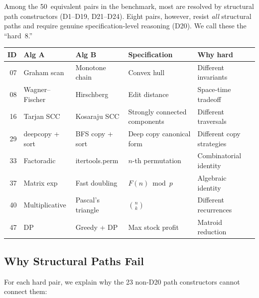 \documentclass[11pt,a4paper]{report}
\theoremstyle{definition}
\theoremstyle{plain}
\begin{document}
Among the 50~equivalent pairs in the benchmark, most are resolved
by structural path constructors (D1--D19, D21--D24).  Eight pairs,
however, resist \emph{all} structural paths and require genuine
specification-level reasoning (D20).  We call these the ``hard~8.''

\begin{center}
\small
\begin{tabular}{r l l p{4.5cm} l}
  \textbf{ID} & \textbf{Alg A} & \textbf{Alg B} &
  \textbf{Specification} & \textbf{Why hard} \\
  \hline
  07 & Graham scan & Monotone chain &
    Convex hull &
    Different invariants \\
  08 & Wagner--Fischer & Hirschberg &
    Edit distance &
    Space-time tradeoff \\
  16 & Tarjan SCC & Kosaraju SCC &
    Strongly connected components &
    Different traversals \\
  29 & deepcopy + sort & BFS copy + sort &
    Deep copy canonical form &
    Different copy strategies \\
  33 & Factoradic & itertools.perm &
    $n$-th permutation &
    Combinatorial identity \\
  37 & Matrix exp & Fast doubling &
    $F(n) \bmod p$ &
    Algebraic identity \\
  40 & Multiplicative & Pascal's triangle &
    $\binom{n}{k}$ &
    Different recurrences \\
  47 & DP & Greedy + DP &
    Max stock profit &
    Matroid reduction \\
\end{tabular}
\end{center}

\subsection{Why Structural Paths Fail}

For each hard pair, we explain why the 23 non-D20 path constructors
cannot connect them:
\end{document}
